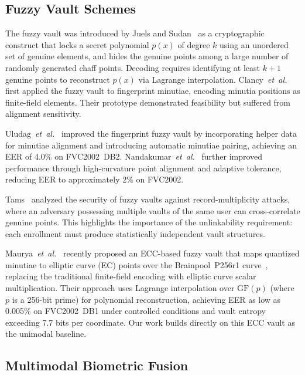 \documentclass[3p,twocolumn]{elsarticle}
\newcommand{\GFp}{\mathrm{GF}(p)}
\begin{document}
\subsection{Fuzzy Vault Schemes}

The fuzzy vault was introduced by Juels and Sudan~\cite{juels2002fuzzy} as a cryptographic construct that locks a secret polynomial $p(x)$ of degree $k$ using an unordered set of genuine elements, and hides the genuine points among a large number of randomly generated chaff points. Decoding requires identifying at least $k+1$ genuine points to reconstruct $p(x)$ via Lagrange interpolation. Clancy~\textit{et~al.}~\cite{clancy2003secure} first applied the fuzzy vault to fingerprint minutiae, encoding minutia positions as finite-field elements. Their prototype demonstrated feasibility but suffered from alignment sensitivity.

Uludag~\textit{et~al.}~\cite{uludag2005fuzzy} improved the fingerprint fuzzy vault by incorporating helper data for minutiae alignment and introducing automatic minutiae pairing, achieving an EER of 4.0\% on FVC2002~DB2. Nandakumar~\textit{et~al.}~\cite{nandakumar2007fuzzy} further improved performance through high-curvature point alignment and adaptive tolerance, reducing EER to approximately 2\% on FVC2002.

Tams~\cite{tams2013attacks} analyzed the security of fuzzy vaults against record-multiplicity attacks, where an adversary possessing multiple vaults of the same user can cross-correlate genuine points. This highlights the importance of the unlinkability requirement: each enrollment must produce statistically independent vault structures.

Maurya~\textit{et~al.}~\cite{maurya2025enhancing} recently proposed an ECC-based fuzzy vault that maps quantized minutiae to elliptic curve (EC) points over the Brainpool~P256r1 curve~\cite{rfc5639}, replacing the traditional finite-field encoding with elliptic curve scalar multiplication. Their approach uses Lagrange interpolation over $\GFp{}$ (where $p$ is a 256-bit prime) for polynomial reconstruction, achieving EER as low as 0.005\% on FVC2002~DB1 under controlled conditions and vault entropy exceeding 7.7 bits per coordinate. Our work builds directly on this ECC vault as the unimodal baseline.

\subsection{Multimodal Biometric Fusion}
\end{document}
